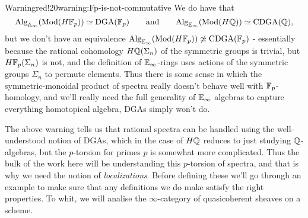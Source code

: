 \begin{env}{Warning}{red!20}{warning:Fp-is-not-commutative}
We do have that
	\[
	{\text{Alg}}_{\mathbb{A}_\infty}({\text{Mod}}(H\mathbb{F}_p)) \simeq \text{DGA}(\mathbb{F}_p)
	\qquad\text{and}\qquad
	{\text{Alg}}_{\mathbb{E}_\infty}({\text{Mod}}(H\mathbb{Q})) \simeq \text{CDGA}(\mathbb{Q}),
	\]
but we don't have an equivalence ${\text{Alg}}_{\mathbb{E}_\infty}({\text{Mod}}(H\mathbb{F}_p)) \not\simeq \text{CDGA}(\mathbb{F}_p)$ - essentially because the rational cohomology $H\mathbb{Q}(\Sigma_n)$ of the symmetric groups is trivial, but $H\mathbb{F}_p(\Sigma_n)$ is not, and the definition of $\mathbb{E}_\infty$-rings uses actions of the symmetric groups $\Sigma_n$ to permute elements. Thus there is some sense in which the symmetric-monoidal product of spectra really doesn't behave well with $\mathbb{F}_p$-homology, and we'll really need the full generality of $\mathbb{E}_\infty$ algebras to capture everything homotopical algebra, DGAs simply won't do.
\end{env}

The above warning tells us that rational spectra can be handled using the well-understood notion of DGAs, which in the case of $H\mathbb{Q}$ reduces to just studying $\mathbb{Q}$-algebras, but the $p$-torsion for primes $p$ is somewhat more complicated. Thus the bulk of the work here will be understanding this $p$-torsion of spectra, and that is why we need the notion of \textit{localizations}. Before defining these we'll go through an example to make sure that any definitions we do make satisfy the right properties. To whit, we will analise the $\infty$-category of quasicoherent sheaves on a scheme. 


\newpage

